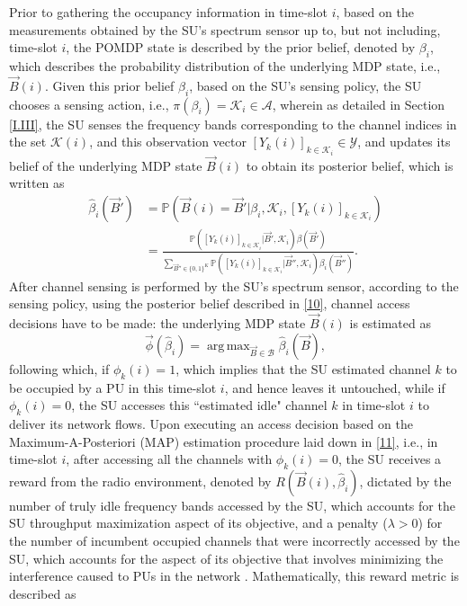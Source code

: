 \documentclass[12pt, draftcls, onecolumn]{IEEEtran}
\DeclareMathOperator*{\argmax}{arg\,max}
\begin{document}
Prior to gathering the occupancy information in time-slot $i$, based on the measurements obtained by the SU's spectrum sensor up to, but not including, time-slot $i$, the POMDP state is described by the prior belief, denoted by $\beta_{i}$, which describes the probability distribution of the underlying MDP state, i.e., $\vec{B}(i)$. Given this prior belief $\beta_{i}$, based on the SU's sensing policy, the SU chooses a sensing action, i.e., $\pi(\beta_{i})=\mathcal{K}_{i}{\in}\mathcal{A}$, wherein as detailed in Section \ref{I.III}, the SU senses the frequency bands corresponding to the channel indices in the set $\mathcal{K}(i)$, and this observation vector $[Y_{k}(i)]_{k{\in}\mathcal{K}_{i}}{\in}\mathcal{Y}$, and updates its belief of the underlying MDP state $\vec{B}(i)$ to obtain its posterior belief, which is written as
\begin{equation}\label{10}
    \begin{aligned}
        \hat{\beta}_{i}(\vec{B}')&=\mathbb{P}(\vec{B}(i)=\vec{B}'|\beta_{i},\mathcal{K}_{i},[Y_{k}(i)]_{k{\in}\mathcal{K}_{i}})\\
        &=\frac{\mathbb{P}([Y_{k}(i)]_{k{\in}\mathcal{K}_{i}}|\vec{B}',\mathcal{K}_{i})\beta(\vec{B}')}{\sum_{\vec{B}'' \in \{0,1\}^{K}}\mathbb{P}([Y_{k}(i)]_{k{\in}\mathcal{K}_{i}}|\vec{B}'',\mathcal{K}_{i})\beta_{i}(\vec{B}'')}.
    \end{aligned}
\end{equation}
After channel sensing is performed by the SU's spectrum sensor, according to the sensing policy, using the posterior belief described in \eqref{10}, channel access decisions have to be made: the underlying MDP state $\vec{B}(i)$ is estimated as
\begin{equation}\label{11}
    \vec{\phi}(\hat{\beta}_{i})=\argmax_{\vec{B} \in \mathcal{B}}\hat{\beta}_{i}(\vec{B}),
\end{equation}
following which, if $\phi_{k}(i){=}1$, which implies that the SU estimated channel $k$ to be occupied by a PU in this time-slot $i$, and hence leaves it untouched, while if $\phi_{k}(i){=}0$, the SU accesses this ``estimated idle" channel $k$ in time-slot $i$ to deliver its network flows. Upon executing an access decision based on the Maximum-A-Posteriori (MAP) estimation procedure laid down in \eqref{11}, i.e., in time-slot $i$, after accessing all the channels with $\phi_{k}(i){=}0$, the SU receives a reward from the radio environment, denoted by $R(\vec{B}(i),\hat{\beta}_{i})$, dictated by the number of truly idle frequency bands accessed by the SU, which accounts for the SU throughput maximization aspect of its objective, and a penalty ($\lambda{>}0$) for the number of incumbent occupied channels that were incorrectly accessed by the SU, which accounts for the aspect of its objective that involves minimizing the interference caused to PUs in the network \cite{WCL:paper}. Mathematically, this reward metric is described as
\end{document}
